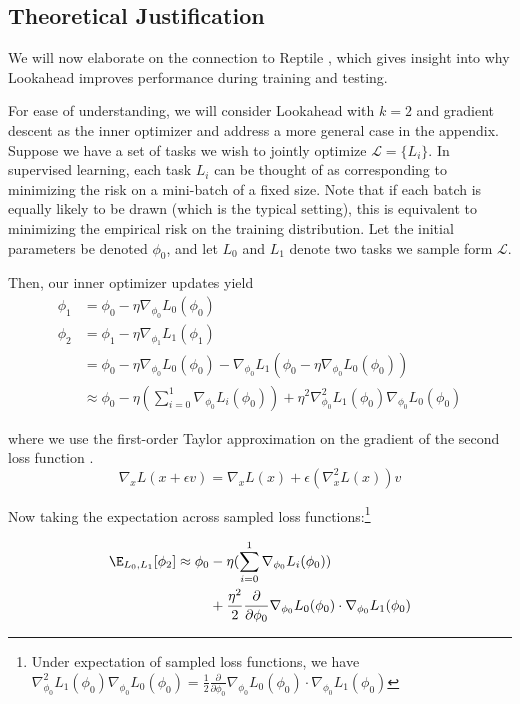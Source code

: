 \documentclass{article}
\begin{document}
\subsection{Theoretical Justification} We will now elaborate on the connection to Reptile \cite{nichol2018reptile}, which gives insight into why Lookahead improves performance during training and testing.

For ease of understanding, we will consider Lookahead with $k=2$ and gradient descent as the inner optimizer and address a more general case in the appendix. Suppose we have a set of tasks we wish to jointly optimize $\mathcal{L} = \{L_i\}$. In supervised learning, each task $L_i$ can be thought of as corresponding to minimizing the risk on a mini-batch of a fixed size. Note that if each batch is equally likely to be drawn (which is the typical setting), this is equivalent to minimizing the empirical risk on the training distribution. Let the initial parameters be denoted $\phi_0$, and let $L_0$ and $L_1$ denote two tasks we sample form $\mathcal{L}$. 

Then, our inner optimizer updates yield 
\begin{align}
    \phi_1 &= \phi_0 - \eta \nabla_{\phi_0} L_0(\phi_0) \\
    \phi_2 
    &= \phi_1 - \eta \nabla_{\phi_1} L_1(\phi_1) \\ 
    &= \phi_0 - \eta \nabla_{\phi_0} L_0(\phi_0) - \nabla_{\phi_0} L_1( \phi_0 - \eta \nabla_{\phi_0} L_0(\phi_0)) \\ 
    &\approx \phi_0 - \eta (\sum_{i=0}^1 \nabla_{\phi_0} L_i(\phi_0)) + \eta^2 \nabla^2_{\phi_0} L_1(\phi_0) \nabla_{\phi_0} L_0(\phi_0) 
\end{align}

where we use the first-order Taylor approximation on the gradient of the second loss function
.
\[
\nabla_x L(x+\epsilon v) = \nabla_x L(x) + \epsilon (\nabla^2_x L(x))v
\]

Now taking the expectation across sampled loss functions:\footnote{Under expectation of sampled loss functions, we have
 $\nabla^2_{\phi_0} L_1(\phi_0) \nabla_{\phi_0} L_0(\phi_0) = \frac{1}{2}\frac{\partial}{\partial \phi_0} \nabla_{\phi_0} L_0(\phi_0) \cdot \nabla_{\phi_0} L_1(\phi_0)$}
 
\begin{align}
    \E_{L_0, L_1}[\phi_2] \approx \phi_0 
    &- \eta (\sum_{i=0}^1 \nabla_{\phi_0} L_i(\phi_0)) \\ 
    &+ \frac{\eta^2}{2}\frac{\partial}{\partial \phi_0} \nabla_{\phi_0} L_0(\phi_0) \cdot \nabla_{\phi_0} L_1(\phi_0)
\end{align}
\end{document}
